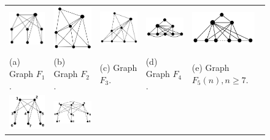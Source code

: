  \begin{figure}[htb]	
 
   \centering
  \begin{tabular}{  p{2.7cm} p{2.7cm} p{2.7cm} p{2.7cm} p{2.7cm} }
    \includegraphics[width=2.5cm]{img/f1.png} 
    & 
    \includegraphics[width=2.1cm]{img/f2.png} 
    & 
    \includegraphics[width=2.7cm]{img/f3.png} 
    & 
    \includegraphics[width=2.7cm]{img/f4.png} 
    & 
    \includegraphics[width=2.7cm]{img/f5.png} 
    \\
    \footnotesize 
    (a)  \footnotesize Graph $F_1$. 
    & 
    \footnotesize (b) Graph $F_2$.
    & 
    \footnotesize (c) Graph $F_3$.
    & 
    \footnotesize (d) Graph $F_4$.
    & 
    \footnotesize (e) Graph $F_5(n),n\geq7$.
    \\%
        \includegraphics[width=2.5cm]{img/f6.png} 
    & 
    \includegraphics[width=2.7cm]{img/f7.png} 

\end{tabular}
\end{figure}
